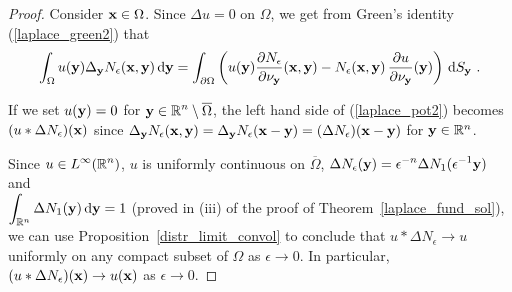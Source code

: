 \begin{proof}
Consider $\mathbf{x} \in \Omega$.
Since $\Delta u = 0$ on $\Omega$, we get from Green's identity
(\ref{laplace_green2}) that
\begin{equation} \label{laplace_pot2}
\int_{\Omega} u(\VEC{y}) \Delta_{\VEC{y}}
N_{\epsilon}(\VEC{x},\VEC{y}) \dx{\VEC{y}}
= \int_{\partial \Omega} \left( u(\VEC{y})
\pdydx{N_{\epsilon}}{\VEC{\nu}_{\VEC{y}}}(\VEC{x},\VEC{y}) -
N_{\epsilon}(\VEC{x},\VEC{y}) \,
\pdydx{u}{\VEC{\nu}_{\VEC{y}}}(\VEC{y})\right) \dss{S}{y} \ .
\end{equation}

If we set $u(\mathbf{y}) = 0$ for
$\displaystyle \mathbf{y} \in \mathbb{R}^n \setminus \overline{\Omega}$,
the left hand side of (\ref{laplace_pot2}) becomes
$(u \ast \Delta N_\epsilon)(\mathbf{x})$ since
$\displaystyle \Delta_{\mathbf{y}} N_{\epsilon}(\mathbf{x},\mathbf{y})
= \Delta_{\mathbf{y}} N_{\epsilon}(\mathbf{x} - \mathbf{y}) =
(\Delta N_\epsilon)(\mathbf{x}-\mathbf{y})$ for
$\mathbf{y} \in \mathbb{R}^n$.

Since $\displaystyle u \in L^\infty(\mathbb{R}^n)$, $u$ is uniformly
continuous on $\overline{\Omega}$, 
$\displaystyle \Delta N_\epsilon(\mathbf{y}) =
\epsilon^{-n}\Delta N_1(\epsilon^{-1}\mathbf{y})$ and\\
$\displaystyle \int_{\mathbb{R}^n} \Delta N_1(\mathbf{y}) \,\mathrm{d}{\mathbf{y}} = 1$
(proved in (iii) of the proof of
Theorem~\ref{laplace_fund_sol}), we can use
Proposition~\ref{distr_limit_convol} to conclude that
$u \ast \Delta N_\epsilon \rightarrow u$ uniformly on any compact
subset of $\Omega$ as $\epsilon \rightarrow 0$.  In particular,
$(u \ast \Delta N_\epsilon)(\mathbf{x}) \rightarrow u(\mathbf{x})$ as
$\epsilon \rightarrow 0$.


\end{proof}
